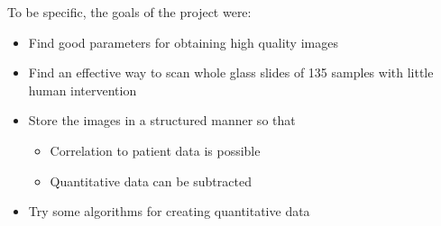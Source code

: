 To be specific, the goals of the project were:
\begin{itemize}
\item  Find good parameters for obtaining high quality images
\item Find an effective way to scan whole glass slides of 135 samples with little human intervention
\item Store the images in a structured manner so that 
    \begin{itemize}
    \item Correlation to patient data is possible
    \item Quantitative data can be subtracted
    \end{itemize}
\item Try some algorithms for creating quantitative data
\end{itemize}